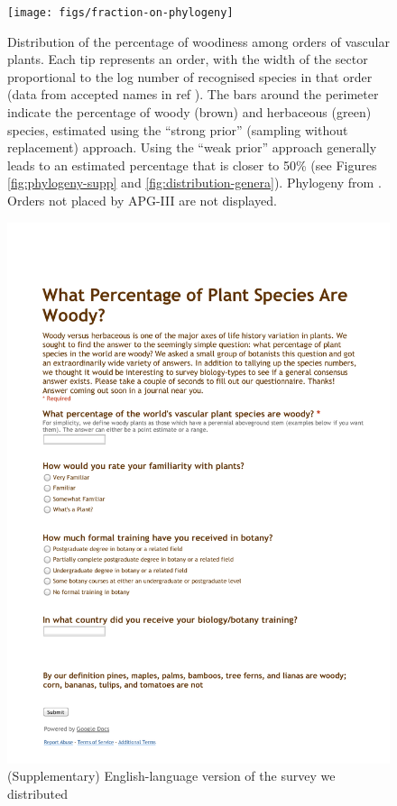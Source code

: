 \documentclass[a4paper,12pt]{article}
\begin{document}
\begin{figure}[p]
  \centering
  \texttt{[image: figs/fraction-on-phylogeny]}
  \caption{Distribution of the percentage of woodiness among orders of
    vascular plants.  Each tip represents an order, with the width of
    the sector proportional to the log number of recognised species in
    that order (data from accepted names in ref \citep{ThePlantList}).
    The bars around the perimeter indicate the percentage of woody
    (brown) and herbaceous (green) species, estimated using the
    ``strong prior'' (sampling without replacement) approach.  Using
    the ``weak prior'' approach generally leads to an estimated
    percentage that is closer to 50\% (see Figures
    \ref{fig:phylogeny-supp} and \ref{fig:distribution-genera}).
    Phylogeny from \citep{Zanne}.  Orders not placed by APG-III
    \citep{APG3} are not displayed.}
\label{fig:phylogeny}
\end{figure}

\clearpage
\renewcommand\thefigure{S.\arabic{figure}}
\renewcommand\thetable{S.\arabic{table}}
\setcounter{figure}{0}    
\setcounter{table}{0}    

\begin{figure}[p]
  \centering
  \vspace{-20ex}
  \includegraphics[scale=0.7]{figs/Survey_supplemental}
  \caption{(Supplementary) English-language version of the survey we
    distributed}
  \label{fig:survey-text}
\end{figure}
\end{document}
